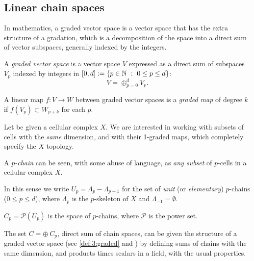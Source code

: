 \subsection{Linear chain spaces}\label{sect:3-3-1}

In mathematics, a graded vector space is a vector space that has the extra structure of a gradation, which is a decomposition of the space into a direct sum of vector subspaces, generally indexed by the integers.

\begin{definition}\label{def:3:graded}
A \emph{graded vector space} is a vector space $V$ expressed as a direct sum  of
subspaces $V_p$ indexed by integers in $[0,d] := \{p\in\N \ :\ 0\leq p\leq d\}$:
\begin{equation} 
V = \oplus_{p = 0}^d V_p.
\end{equation} 
\end{definition}

\begin{definition}\label{def:graded}
A linear map $f:V\to W$ between graded vector spaces is a \emph{graded
map} of degree $k\ $ if $f(V_p) \subset W_{p+k}$ for each $p$.
\end{definition}

Let be given a cellular complex $X$. We are interested in working with subsets of cells with the \emph{same} dimension, and with their 1-graded maps, which completely specify the $X$ topology.

\begin{definition}[$p$-chain]
A \emph{$p$-chain} can be seen, with some abuse of language, as \emph{any subset} of $p$-cells in a cellular complex $X$. 
\end{definition}


\begin{definition}
In this sense we write $U_p = \Lambda_p - \Lambda_{p-1}$ for the set of \emph{unit} (or \emph{elementary}) $p$-chains ($0\leq p\leq d$), where $\Lambda_p$ is the $p$-skeleton of $X$ and $\Lambda_{-1} = \emptyset$.
\end{definition}

\begin{definition}
$C_p = \mathcal{P}(U_p)$ is the space of $p$-chains, where $\mathcal{P}$ is the power set.
\end{definition}

The set $C=\oplus\ C_p$, direct sum of chain spaces, can be given the structure of a graded vector space (see \ref{def:3:graded} and \cite{Arnold:2018}) by
defining sums of chains with the same dimension, and products times scalars in a
field, with the usual properties.

